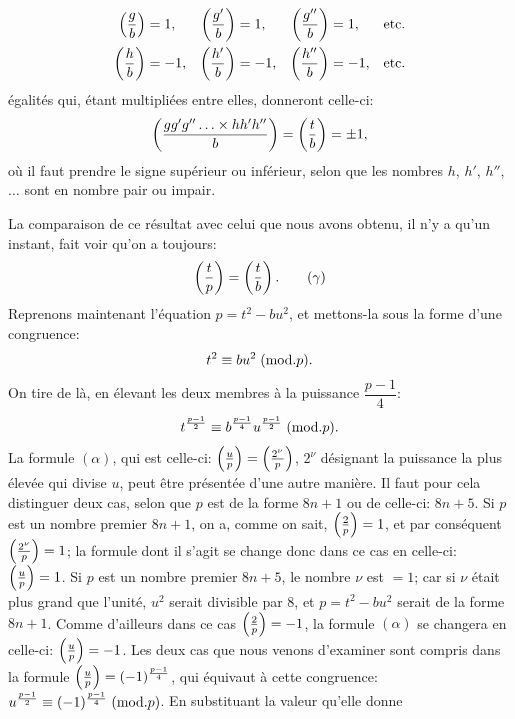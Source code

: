 \[
\begin{aligned}
\left(\frac{g}{b}\right)&=1, &\left(\frac{g'}{b}\right)&=1, &\left(\frac{g''}{b}\right)&=1, &\text{etc.}\\
\left(\frac{h}{b}\right)&=-1, &\left(\frac{h'}{b}\right)&=-1, &\left(\frac{h''}{b}\right)&=-1, &\text{etc.}
\end{aligned}
\]
égalités qui, étant multipliées entre elles, donneront celle-ci:
\[
\left(\frac{gg'g''\ldots\times hh'h''}{b}\right)=\left(\frac{t}{b}\right)=\pm1,
\]
où il faut prendre le signe supérieur ou inférieur, selon que les nombres $h$,
$h'$, $h''$, $\ldots$ sont en nombre pair ou impair.
\par\indent
La comparaison de ce résultat avec celui que nous avons obtenu, il n'y
a qu'un instant, fait voir qu'on a toujours:
\begin{equation*}
\left(\frac{t}{p}\right)=\left(\frac{t}{b}\right).\tag{$\gamma$}
\end{equation*}
Reprenons maintenant l'équation $p=t^2-bu^2$, et mettons-la sous la forme d'une
congruence:
\[
t^2\equiv bu^2\;(\mathrm{mod}.p).
\]
On tire de là, en élevant les deux membres à la puissance $\dfrac{p-1}{4}$:
\[
t^{\frac{p-1}{2}}\equiv b^{\frac{p-1}{4}}u^{\frac{p-1}{2}}\;(\mathrm{mod}.p).
\]
La formule $(\alpha)$, qui est celle-ci: $\left(\frac{u}{p}\right)=\left(\frac{2^\nu}{p}\right)$, $2^\nu$ désignant la puissance la plus
élevée qui divise $u$, peut être présentée d'une autre manière. Il faut pour cela
distinguer deux cas, selon que $p$ est de la forme $8n+1$ ou de celle-ci: $8n+5$.
Si $p$ est un nombre premier $8n+1$, on a, comme on sait, $\left(\frac{2}{p}\right)=1$, et par
conséquent $\left(\frac{2^\nu}{p}\right)=1$; la formule dont il s'agit se change donc dans ce cas en
celle-ci: $\left(\frac{u}{p}\right)=1$. Si $p$ est un nombre premier $8n+5$, le nombre $\nu$ est $=1$;
car si $\nu$ était plus grand que l'unité, $u^2$ serait divisible par $8$, et $p=t^2-bu^2$
serait de la forme $8n+1$. Comme d'ailleurs dans ce cas $\left(\frac{2}{p}\right)=-1$, la formule
$(\alpha)$ se changera en celle-ci: $\left(\frac{u}{p}\right)=-1$. Les deux cas que nous venons
d'examiner sont compris dans la formule $\left(\frac{u}{p}\right)=(-1)^{\frac{p-1}{4}}$, qui équivaut à cette
congruence: $u^{\frac{p-1}{2}}\equiv(-1)^{\frac{p-1}{4}}\;(\mathrm{mod}.p)$. En substituant la valeur qu'elle donne
